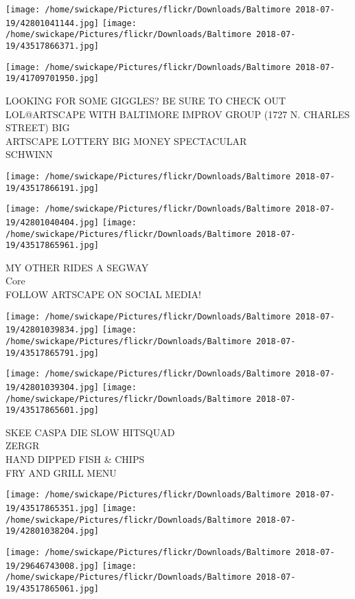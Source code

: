 \documentclass[10pt,letterpaper]{article}
\begin{document}
\texttt{[image: /home/swickape/Pictures/flickr/Downloads/Baltimore 2018-07-19/42801041144.jpg]}
\texttt{[image: /home/swickape/Pictures/flickr/Downloads/Baltimore 2018-07-19/43517866371.jpg]}

\texttt{[image: /home/swickape/Pictures/flickr/Downloads/Baltimore 2018-07-19/41709701950.jpg]}

LOOKING FOR SOME GIGGLES?  BE SURE TO CHECK OUT LOL@ARTSCAPE WITH BALTIMORE IMPROV GROUP (1727 N. CHARLES STREET) BIG\\
ARTSCAPE LOTTERY BIG MONEY SPECTACULAR\\
SCHWINN\\
\pagebreak

\texttt{[image: /home/swickape/Pictures/flickr/Downloads/Baltimore 2018-07-19/43517866191.jpg]}

\vspace{0.25in}
\texttt{[image: /home/swickape/Pictures/flickr/Downloads/Baltimore 2018-07-19/42801040404.jpg]}
\texttt{[image: /home/swickape/Pictures/flickr/Downloads/Baltimore 2018-07-19/43517865961.jpg]}

MY OTHER RIDES A SEGWAY\\
Core\\
FOLLOW ARTSCAPE ON SOCIAL MEDIA!\\
\pagebreak

\texttt{[image: /home/swickape/Pictures/flickr/Downloads/Baltimore 2018-07-19/42801039834.jpg]}
\texttt{[image: /home/swickape/Pictures/flickr/Downloads/Baltimore 2018-07-19/43517865791.jpg]}

\texttt{[image: /home/swickape/Pictures/flickr/Downloads/Baltimore 2018-07-19/42801039304.jpg]}
\texttt{[image: /home/swickape/Pictures/flickr/Downloads/Baltimore 2018-07-19/43517865601.jpg]}

SKEE CASPA DIE SLOW HITSQUAD\\
ZERGR\\
HAND DIPPED FISH \& CHIPS\\
FRY AND GRILL MENU\\
\pagebreak

\texttt{[image: /home/swickape/Pictures/flickr/Downloads/Baltimore 2018-07-19/43517865351.jpg]}
\texttt{[image: /home/swickape/Pictures/flickr/Downloads/Baltimore 2018-07-19/42801038204.jpg]}

\texttt{[image: /home/swickape/Pictures/flickr/Downloads/Baltimore 2018-07-19/29646743008.jpg]}
\texttt{[image: /home/swickape/Pictures/flickr/Downloads/Baltimore 2018-07-19/43517865061.jpg]}
\end{document}
